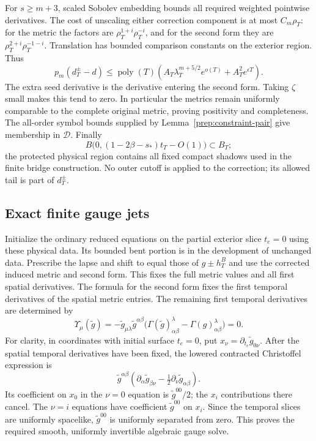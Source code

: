 For $s\ge m+3$, scaled Sobolev embedding bounds all required weighted
pointwise derivatives.  The cost of unscaling either correction
component is at most $C_m\rho_T$: for the metric the factors are
$\rho_T^{1+i}\rho_T^{-i}$, and for the second form they are
$\rho_T^{2+i}\rho_T^{-1-i}$.  Translation has bounded comparison
constants on the exterior region.  Thus
\begin{equation}\label{prep:physical-data-bound}
 p_m(d_T^\pm-d)
 \le \operatorname{poly}(T)\left(
       A_T\lambda_T^{m+5/2}e^{o(T)}
          +A_T^2e^{\epsilon T}\right).
\end{equation}
The extra seed derivative is the derivative entering the second
form.  Taking $\zeta$ small makes this tend to zero.  In particular
the metrics remain uniformly comparable to the complete original
metric, proving positivity and completeness.  The all-order symbol
bounds supplied by Lemma~\ref{prep:constraint-pair} give membership
in $\mathcal D$.  Finally
\[
 B\bigl(0,(1-2\beta-s_*)t_T-O(1)\bigr)\subset B_T;
\]
the protected physical region contains all fixed compact shadows
used in the finite bridge construction.  No outer cutoff is applied
to the correction; its allowed tail is part of $d_T^\pm$.

\subsection{Exact finite gauge jets}

Initialize the ordinary reduced equations on the partial exterior
slice $t_e=0$ using these physical data.  Its bounded bent portion
is in the development of unchanged data.  Prescribe the lapse and
shift to equal those of $g\pm h_T^B$ and use the corrected induced
metric and second form.  This fixes the full metric values and all
first spatial derivatives.  The formula for the second form fixes
the first temporal derivatives of the spatial metric entries.
The remaining first temporal derivatives are determined by
\begin{equation}\label{prep:wave-gauge}
 \Upsilon_\mu(\widetilde g)
 =-\widetilde g_{\mu\lambda}\widetilde g^{\alpha\beta}
       \bigl(\Gamma(\widetilde g)^\lambda_{\alpha\beta}
                         -\Gamma(g)^\lambda_{\alpha\beta}\bigr)=0.
\end{equation}
For clarity, in coordinates with initial surface $t_e=0$, put
$x_\nu=\partial_{t_e}\widetilde g_{0\nu}$.  After the spatial
temporal derivatives have been fixed, the lowered contracted
Christoffel expression is
\[
 \widetilde g^{\alpha\beta}
  \left(\partial_\alpha\widetilde g_{\beta\nu}
                   -\tfrac12\partial_\nu\widetilde g_{\alpha\beta}\right).
\]
Its coefficient on $x_0$ in the $\nu=0$ equation is
$\widetilde g^{00}/2$; the $x_i$ contributions there cancel.
The $\nu=i$ equations have coefficient $\widetilde g^{00}$ on
$x_i$.  Since the temporal slices are uniformly spacelike,
$\widetilde g^{00}$ is uniformly separated from zero.  This proves
the required smooth, uniformly invertible algebraic gauge solve.

